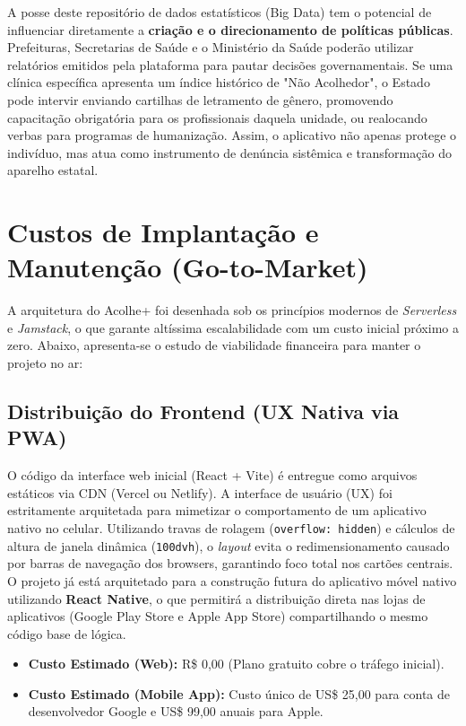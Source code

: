 \documentclass[12pt, a4paper]{article}
\begin{document}
A posse deste repositório de dados estatísticos (Big Data) tem o potencial de influenciar diretamente a \textbf{criação e o direcionamento de políticas públicas}. Prefeituras, Secretarias de Saúde e o Ministério da Saúde poderão utilizar relatórios emitidos pela plataforma para pautar decisões governamentais. Se uma clínica específica apresenta um índice histórico de "Não Acolhedor", o Estado pode intervir enviando cartilhas de letramento de gênero, promovendo capacitação obrigatória para os profissionais daquela unidade, ou realocando verbas para programas de humanização. Assim, o aplicativo não apenas protege o indivíduo, mas atua como instrumento de denúncia sistêmica e transformação do aparelho estatal.

\section{Custos de Implantação e Manutenção (Go-to-Market)}

A arquitetura do Acolhe+ foi desenhada sob os princípios modernos de \textit{Serverless} e \textit{Jamstack}, o que garante altíssima escalabilidade com um custo inicial próximo a zero. Abaixo, apresenta-se o estudo de viabilidade financeira para manter o projeto no ar:

\subsection{Distribuição do Frontend (UX Nativa via PWA)}
O código da interface web inicial (React + Vite) é entregue como arquivos estáticos via CDN (Vercel ou Netlify). A interface de usuário (UX) foi estritamente arquitetada para mimetizar o comportamento de um aplicativo nativo no celular. Utilizando travas de rolagem (\texttt{overflow: hidden}) e cálculos de altura de janela dinâmica (\texttt{100dvh}), o \textit{layout} evita o redimensionamento causado por barras de navegação dos browsers, garantindo foco total nos cartões centrais. O projeto já está arquitetado para a construção futura do aplicativo móvel nativo utilizando \textbf{React Native}, o que permitirá a distribuição direta nas lojas de aplicativos (Google Play Store e Apple App Store) compartilhando o mesmo código base de lógica.
\begin{itemize}
    \item \textbf{Custo Estimado (Web):} R\$ 0,00 (Plano gratuito cobre o tráfego inicial).
    \item \textbf{Custo Estimado (Mobile App):} Custo único de US\$ 25,00 para conta de desenvolvedor Google e US\$ 99,00 anuais para Apple.
\end{itemize}
\end{document}
